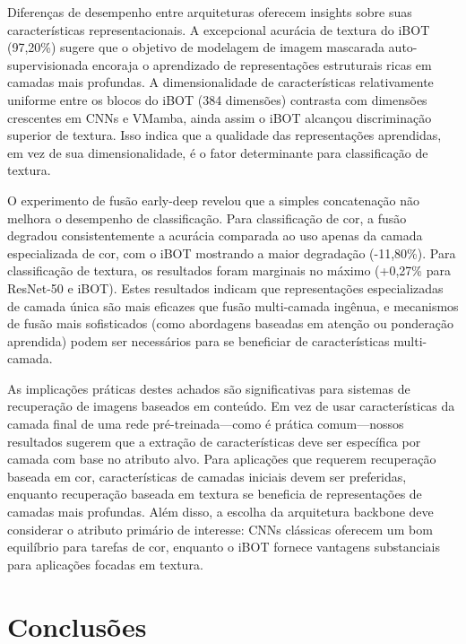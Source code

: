 \documentclass[conference]{IEEEtran}
\begin{document}
Diferen\c{c}as de desempenho entre arquiteturas oferecem insights sobre suas caracter\'{i}sticas representacionais. A excepcional acur\'{a}cia de textura do iBOT (97,20\%) sugere que o objetivo de modelagem de imagem mascarada auto-supervisionada encoraja o aprendizado de representa\c{c}\~{o}es estruturais ricas em camadas mais profundas. A dimensionalidade de caracter\'{i}sticas relativamente uniforme entre os blocos do iBOT (384 dimens\~{o}es) contrasta com dimens\~{o}es crescentes em CNNs e VMamba, ainda assim o iBOT alcan\c{c}ou discrimina\c{c}\~{a}o superior de textura. Isso indica que a qualidade das representa\c{c}\~{o}es aprendidas, em vez de sua dimensionalidade, \'{e} o fator determinante para classifica\c{c}\~{a}o de textura.

O experimento de fus\~{a}o early-deep revelou que a simples concatena\c{c}\~{a}o n\~{a}o melhora o desempenho de classifica\c{c}\~{a}o. Para classifica\c{c}\~{a}o de cor, a fus\~{a}o degradou consistentemente a acur\'{a}cia comparada ao uso apenas da camada especializada de cor, com o iBOT mostrando a maior degrada\c{c}\~{a}o (-11,80\%). Para classifica\c{c}\~{a}o de textura, os resultados foram marginais no m\'{a}ximo (+0,27\% para ResNet-50 e iBOT). Estes resultados indicam que representa\c{c}\~{o}es especializadas de camada \'{u}nica s\~{a}o mais eficazes que fus\~{a}o multi-camada ing\^{e}nua, e mecanismos de fus\~{a}o mais sofisticados (como abordagens baseadas em aten\c{c}\~{a}o ou pondera\c{c}\~{a}o aprendida) podem ser necess\'{a}rios para se beneficiar de caracter\'{i}sticas multi-camada.

As implica\c{c}\~{o}es pr\'{a}ticas destes achados s\~{a}o significativas para sistemas de recupera\c{c}\~{a}o de imagens baseados em conte\'{u}do. Em vez de usar caracter\'{i}sticas da camada final de uma rede pr\'{e}-treinada---como \'{e} pr\'{a}tica comum---nossos resultados sugerem que a extra\c{c}\~{a}o de caracter\'{i}sticas deve ser espec\'{i}fica por camada com base no atributo alvo. Para aplica\c{c}\~{o}es que requerem recupera\c{c}\~{a}o baseada em cor, caracter\'{i}sticas de camadas iniciais devem ser preferidas, enquanto recupera\c{c}\~{a}o baseada em textura se beneficia de representa\c{c}\~{o}es de camadas mais profundas. Al\'{e}m disso, a escolha da arquitetura backbone deve considerar o atributo prim\'{a}rio de interesse: CNNs cl\'{a}ssicas oferecem um bom equil\'{i}brio para tarefas de cor, enquanto o iBOT fornece vantagens substanciais para aplica\c{c}\~{o}es focadas em textura.


\section{Conclus\~{o}es}
\end{document}
